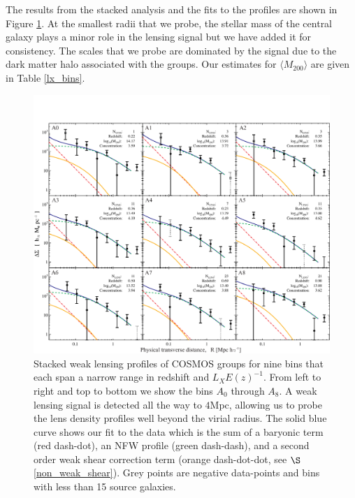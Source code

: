\documentclass[12pt]{emulateapj}
\begin{document}
The results from the stacked analysis and the fits to the profiles are
shown in Figure \ref{wl_signal}. At the smallest radii that we probe,
the stellar mass of the central galaxy plays a minor role in the
lensing signal but we have added it for consistency. The scales that
we probe are dominated by the signal due to the dark matter halo
associated with the groups. Our estimates for $\langle M_{200}
\rangle$ are given in Table \ref{lx_bins}.

\begin{figure}[htb]
\centerline{\includegraphics[scale=0.42]{figure4.pdf}}
\caption{Stacked weak lensing profiles of COSMOS groups for nine bins
  that each span a narrow range in redshift and $L_X E(z)^{-1}$. From
  left to right and top to bottom we show the bins $A_0$ through
  $A_8$. A weak lensing signal is detected all the way to $4$Mpc,
  allowing us to probe the lens density profiles well beyond the
  virial radius. The solid blue curve shows our fit to the data which
  is the sum of a baryonic term (red dash-dot), an NFW profile (green
  dash-dash), and a second order weak shear correction term (orange
  dash-dot-dot, see $\S$ \ref{non_weak_shear}). Grey points are
  negative data-points and bins with less than 15 source galaxies.}
\label{wl_signal}
\end{figure}
\end{document}
